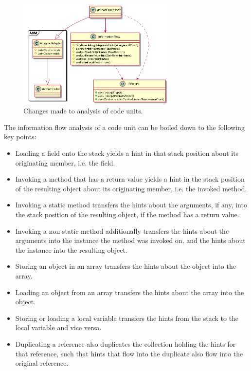 \begin{figure}
    \centering
    \includegraphics[width=0.7\textwidth]{figure/extension/MethodProcessor2.png}
    \caption{Changes made to analysis of code units.}
    \label{fig:method_processor_2}
\end{figure}

The information flow analysis of a code unit can be boiled down to the following key points:

\begin{itemize}
    \item Loading a field onto the stack yields a hint in that stack position about its originating member, i.e. the field.
    \item Invoking a method that has a return value yields a hint in the stack position of the resulting object about its originating member, i.e. the invoked method.
    \item Invoking a static method transfers the hints about the arguments, if any, into the stack position of the resulting object, if the method has a return value.
    \item Invoking a non-static method additionally transfers the hints about the arguments into the instance the method was invoked on, and the hints about the instance into the resulting object.
    \item Storing an object in an array transfers the hints about the object into the array.
    \item Loading an object from an array transfers the hints about the array into the object.
    \item Storing or loading a local variable transfers the hints from the stack to the local variable and vice versa.
    \item Duplicating a reference also duplicates the collection holding the hints for that reference, such that hints that flow into the duplicate also flow into the original reference.
\end{itemize}

